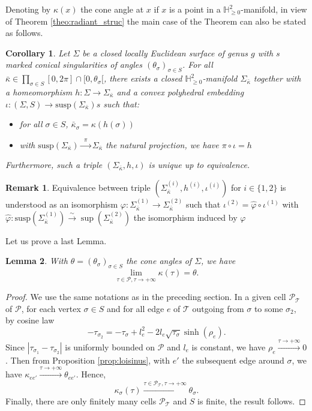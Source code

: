 \documentclass[a4paper,12pt]{article}
\def\H{\mathbb{H}}
\def\TT{\mathcal T}
\def\adm{\P}
\def\susp{\mathrm{susp}}
\def\adm{\mathcal{P}}
\def\susp{\mathrm{susp}}
\def\P{\mathcal{P}}
\def\CellPSigma{\P_\TT}
\newtheorem{lem}{Lemma}[section]		 %
\newtheorem{cor}[lem]{Corollary}
\theoremstyle{definition}
\newtheorem*{rem}{Remark}			 %
\begin{document}
			
			Denoting by $\kappa(x)$ the cone angle at $x$ if $x$ is a point in a $\H^2_{\geq0}$-manifold, in view of Theorem \ref{theo:radiant_struc} the main case of the Theorem can also be stated as follows.
			\begin{cor} 
			 	Let $\Sigma$ be a closed locally Euclidean surface of genus $g$ with $s$ marked conical singularities of angles $(\theta_\sigma)_{\sigma\in S}$.
				For all $\bar\kappa\in \prod_{\sigma \in S}[0,2\pi]\cap [0,\theta_\sigma[$, there exists a closed $\H^2_{\geq0}$-manifold $\Sigma_{\bar \kappa}$ together with a homeomorphism $h:\Sigma\rightarrow \Sigma_{\bar\kappa}$ and a convex polyhedral embedding $\iota: (\Sigma, S)\rightarrow \susp(\Sigma_{\bar\kappa})s$ such that:
				\begin{itemize}
				 \item for all $\sigma\in S$, $\bar\kappa_\sigma = \kappa(h(\sigma))$
				 \item with $\susp(\Sigma_{\bar\kappa})\xrightarrow{~~\pi~~} \Sigma_{\bar\kappa}$ the natural projection, we have $\pi\circ \iota = h$
				\end{itemize}
				Furthermore, such a triple $(\Sigma_{\bar\kappa},h,\iota)$ is unique up to equivalence.
			\end{cor}
			\begin{rem} Equivalence between triple $(\Sigma_{\bar\kappa}^{(i)},h^{(i)},\iota^{(i)})$ for $i\in\{1,2\}$ is understood as an isomorphism $\varphi: \Sigma_{\bar\kappa}^{(1)} \rightarrow \Sigma_{\bar\kappa}^{(2)}$ such that $\iota^{(2)} = \hat\varphi \circ \iota^{(1)} $ with $\hat\varphi: \susp(\Sigma_{\bar\kappa}^{(1)}) \xrightarrow{\sim} \sup(\Sigma_{\bar\kappa}^{(2)})$ the isomorphism induced by $\varphi$
			 
			\end{rem}

			Let us prove a last Lemma.
			\begin{lem}\label{lem:limite_infty}With $\theta=(\theta_\sigma)_{\sigma\in S}$ the cone angles of $\Sigma$, we have
				 $$\lim_{\tau\in \adm,\tau\rightarrow+\infty} \kappa(\tau)=\theta.$$
				\end{lem}
				\begin{proof}We use the same notations as in the preceding section.
				 In a given cell $\CellPSigma$ of $\P$, for each vertex $\sigma \in S$ and for all edge $e$ of $\TT$ outgoing from $\sigma$ to some $\sigma_2$, by cosine law 
				 $$ -\tau_{\sigma_2} =-\tau_{\sigma}+l_e^2 - 2 l_e \sqrt{\tau_{\sigma}} \sinh(\rho_e).$$
				 Since $|\tau_{\sigma_1}-\tau_{\sigma_2}|$ is uniformly bounded on $\adm$ and $l_e$ is constant, we have $\rho_e \xrightarrow{\tau\rightarrow+\infty} 0$. Then from Proposition
				 \ref{prop:loisinus}, with $e'$ the subsequent edge around $\sigma$, we have $\kappa_{ee'} \xrightarrow{\tau\rightarrow +\infty} \theta_{ee'}$. Hence, $$\kappa_\sigma(\tau)\xrightarrow{\tau\in \CellPSigma,\tau\rightarrow +\infty} \theta_\sigma.$$
				 Finally, there are only finitely many cells $\CellPSigma$ and $S$ is finite, the result follows. 
				\end{proof}
\end{document}
